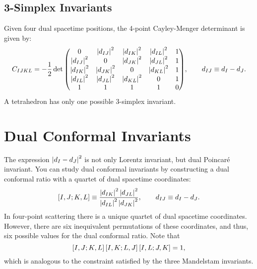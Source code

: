\subsection{3-Simplex Invariants}
Given four dual spacetime positions, the 4-point Cayley-Menger determinant is given by:
\begin{equation}
	C_{IJKL} = -\frac{1}{2} \det{
	\begin{pmatrix}
	0 & \left\lvert d_{IJ} \right\rvert^{2} & \left\lvert d_{IK} \right\rvert^{2} & \left\lvert d_{IL} \right\rvert^{2} & 1 \\
	\left\lvert d_{IJ} \right\rvert^{2} & 0 & \left\lvert d_{JK} \right\rvert^{2} & \left\lvert d_{JL} \right\rvert^{2} & 1 \\
	\left\lvert d_{IK} \right\rvert^{2} & \left\lvert d_{JK} \right\rvert^{2} & 0 & \left\lvert d_{KL} \right\rvert^{2} & 1 \\
	\left\lvert d_{IL} \right\rvert^{2} & \left\lvert d_{JL} \right\rvert^{2} & \left\lvert d_{KL} \right\rvert^{2} & 0 & 1 \\
	1 & 1 & 1 & 1 & 0
	\end{pmatrix}
	}, \qquad d_{IJ} \equiv d_{I} - d_{J}.
\end{equation}
A tetrahedron has only one possible 3-simplex invariant.
\section{Dual Conformal Invariants}
The expression $\left\lvert d_{I} - d_{J} \right\rvert^{2}$ is not only Lorentz invariant, but dual Poincar\'{e} invariant. You can study dual conformal invariants by constructing a dual conformal ratio with a quartet of dual spacetime coordinates:
\begin{equation}
	\left[ I , J ; K , L \right] \equiv \frac{\left\lvert d_{IK} \right\rvert^{2} \left\lvert d_{JL} \right\rvert^{2}}{\left\lvert d_{IL} \right\rvert^{2} \left\lvert d_{JK} \right\rvert^{2}}, \qquad d_{IJ} \equiv d_{I} - d_{J}.
\end{equation}
In four-point scattering there is a unique quartet of dual spacetime coordinates. However, there are six inequivalent permutations of these coordinates, and thus, six possible values for the dual conformal ratio. Note that
\begin{equation}
	\left[ I , J ; K , L \right] \left[ I , K ; L , J \right] \left[ I , L ; J , K \right] = 1,
\end{equation}
which is analogous to the constraint satisfied by the three Mandelstam invariants.
